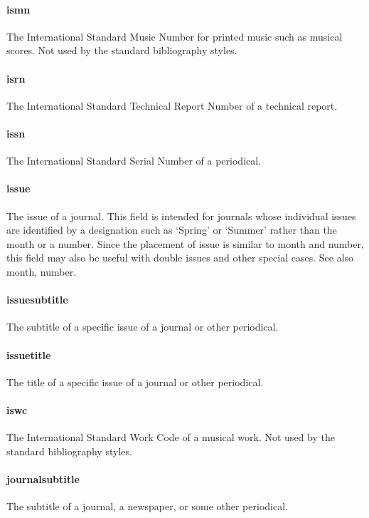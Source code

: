 \documentclass[a4paper,12pt]{report}
\begin{document}
\paragraph{ismn}
The International Standard Music Number for printed music such as musical scores. Not
used by the standard bibliography styles.

\paragraph{isrn}
The International Standard Technical Report Number of a technical report.

\paragraph{issn}
The International Standard Serial Number of a periodical.

\paragraph{issue}
The issue of a journal. This field is intended for journals whose individual issues are
identified by a designation such as ‘Spring’ or ‘Summer’ rather than the month or a number.
Since the placement of issue is similar to month and number, this field may also be useful
with double issues and other special cases. See also month, number.

\paragraph{issuesubtitle}
The subtitle of a specific issue of a journal or other periodical.

\paragraph{issuetitle}
The title of a specific issue of a journal or other periodical.

\paragraph{iswc}
The International Standard Work Code of a musical work. Not used by the standard
bibliography styles.

\paragraph{journalsubtitle}
The subtitle of a journal, a newspaper, or some other periodical.
\end{document}
